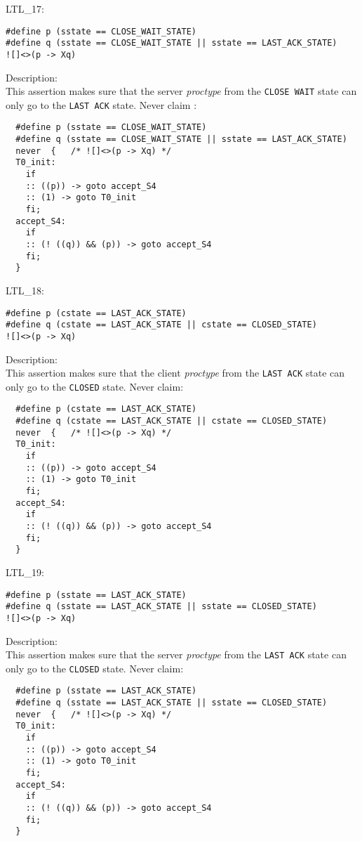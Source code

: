 \documentclass{WigReport}
\begin{document}
LTL\_17:\\
\begin{lstlisting}
#define p (sstate == CLOSE_WAIT_STATE)
#define q (sstate == CLOSE_WAIT_STATE || sstate == LAST_ACK_STATE)
![]<>(p -> Xq)
\end{lstlisting}
Description:\\
This assertion makes sure that the server \textit{proctype} from the \verb|CLOSE WAIT| state can only go to the \verb|LAST ACK| state.
Never claim :\\ 
\begin{lstlisting}
  #define p (sstate == CLOSE_WAIT_STATE)
  #define q (sstate == CLOSE_WAIT_STATE || sstate == LAST_ACK_STATE)
  never  {   /* ![]<>(p -> Xq) */
  T0_init:
    if
    :: ((p)) -> goto accept_S4
    :: (1) -> goto T0_init
    fi;
  accept_S4:
    if
    :: (! ((q)) && (p)) -> goto accept_S4
    fi;
  }
\end{lstlisting}


LTL\_18:\\
\begin{lstlisting}
#define p (cstate == LAST_ACK_STATE)
#define q (cstate == LAST_ACK_STATE || cstate == CLOSED_STATE)
![]<>(p -> Xq)
\end{lstlisting}
Description:\\
This assertion makes sure that the client \textit{proctype} from the \verb|LAST ACK| state can only go to the \verb|CLOSED| state.
Never claim:\\
\begin{lstlisting}
  #define p (cstate == LAST_ACK_STATE)
  #define q (cstate == LAST_ACK_STATE || cstate == CLOSED_STATE)
  never  {   /* ![]<>(p -> Xq) */
  T0_init:
    if
    :: ((p)) -> goto accept_S4
    :: (1) -> goto T0_init
    fi;
  accept_S4:
    if
    :: (! ((q)) && (p)) -> goto accept_S4
    fi;
  }
\end{lstlisting}


LTL\_19:\\
\begin{lstlisting}
#define p (sstate == LAST_ACK_STATE)
#define q (sstate == LAST_ACK_STATE || sstate == CLOSED_STATE)
![]<>(p -> Xq)
\end{lstlisting}
Description:\\
This assertion makes sure that the server \textit{proctype} from the \verb|LAST ACK| state can only go to the \verb|CLOSED| state.
Never claim:\\
\begin{lstlisting}
  #define p (sstate == LAST_ACK_STATE)
  #define q (sstate == LAST_ACK_STATE || sstate == CLOSED_STATE)
  never  {   /* ![]<>(p -> Xq) */
  T0_init:
    if
    :: ((p)) -> goto accept_S4
    :: (1) -> goto T0_init
    fi;
  accept_S4:
    if
    :: (! ((q)) && (p)) -> goto accept_S4
    fi;
  }
\end{lstlisting}
\end{document}
